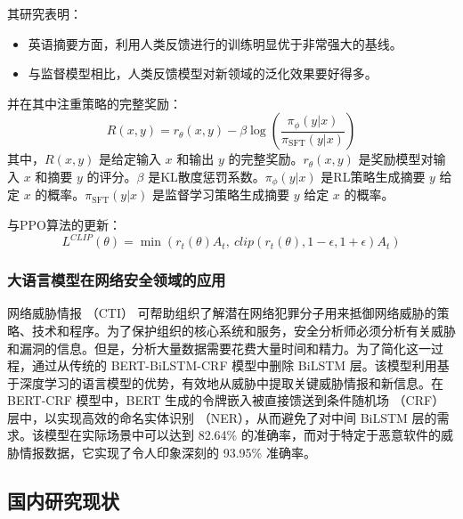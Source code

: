 其研究表明：
\begin{itemize}
    \item 英语摘要方面，利用人类反馈进行的训练明显优于非常强大的基线。
    \item 与监督模型相比，人类反馈模型对新领域的泛化效果要好得多。
\end{itemize}

并在其中注重策略的完整奖励：
\[R(x, y) = r_\theta(x, y) - \beta \log \left( \frac{\pi_{\phi}(y|x)}{\pi_{\text{SFT}}(y|x)} \right)\]
其中，\(R(x, y)\) 是给定输入 \(x\) 和输出 \(y\) 的完整奖励。\(r_\theta(x, y)\) 是奖励模型对输入 \(x\) 和摘要 \(y\) 的评分。\(\beta\) 是KL散度惩罚系数。\(\pi_\phi(y|x)\) 是RL策略生成摘要 \(y\) 给定 \(x\) 的概率。\(\pi_{\text{SFT}}(y|x)\) 是监督学习策略生成摘要 \(y\) 给定 \(x\) 的概率。

与PPO算法的更新：
\[L^{CLIP}(\theta) = \min \left( r_{t}(\theta)A_{t}, \ clip \left( r_{t}(\theta), 1-\epsilon, 1+\epsilon \right) A_{t} \right)\]
\subsubsection{大语言模型在网络安全领域的应用}
网络威胁情报 （CTI） 可帮助组织了解潜在网络犯罪分子用来抵御网络威胁的策略、技术和程序。为了保护组织的核心系统和服务，安全分析师必须分析有关威胁和漏洞的信息。但是，分析大量数据需要花费大量时间和精力。为了简化这一过程，通过从传统的 BERT-BiLSTM-CRF 模型中删除 BiLSTM 层。该模型利用基于深度学习的语言模型的优势，有效地从威胁中提取关键威胁情报和新信息。在 BERT-CRF 模型中，BERT 生成的令牌嵌入被直接馈送到条件随机场 （CRF） 层中，以实现高效的命名实体识别 （NER），从而避免了对中间 BiLSTM 层的需求。该模型在实际场景中可以达到 82.64\% 的准确率，而对于特定于恶意软件的威胁情报数据，它实现了令人印象深刻的 93.95\% 准确率\cite{10436853}。

\subsection{国内研究现状}
